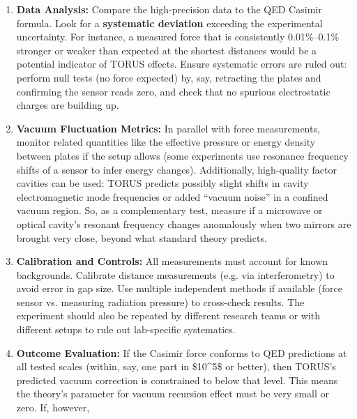 \documentclass[]{article}
\begin{document}
{\begin{itemize}
\begin{enumerate}
    check for any unexpected dependence on material or configuration.
    TORUS's recursion fields might interact differently with different
    boundary conditions​. Standard theory predicts only geometry and
    distance matter (aside from well-understood material corrections);
    any new dependence could be a TORUS signature.
  \item
    \textbf{Data Analysis:} Compare the high-precision data to the QED
    Casimir formula. Look for a \textbf{systematic deviation} exceeding
    the experimental uncertainty. For instance, a measured force that is
    consistently 0.01\%--0.1\% stronger or weaker than expected at the
    shortest distances would be a potential indicator of TORUS effects​.
    Ensure systematic errors are ruled out: perform null tests (no force
    expected) by, say, retracting the plates and confirming the sensor
    reads zero, and check that no spurious electrostatic charges are
    building up.
  \item
    \textbf{Vacuum Fluctuation Metrics:} In parallel with force
    measurements, monitor related quantities like the effective pressure
    or energy density between plates if the setup allows (some
    experiments use resonance frequency shifts of a sensor to infer
    energy changes). Additionally, high-quality factor cavities can be
    used: TORUS predicts possibly slight shifts in cavity
    electromagnetic mode frequencies or added ``vacuum noise'' in a
    confined vacuum region​. So, as a complementary test, measure if a
    microwave or optical cavity's resonant frequency changes anomalously
    when two mirrors are brought very close, beyond what standard theory
    predicts.
  \item
    \textbf{Calibration and Controls:} All measurements must account for
    known backgrounds. Calibrate distance measurements (e.g. via
    interferometry) to avoid error in gap size. Use multiple independent
    methods if available (force sensor vs. measuring radiation pressure)
    to cross-check results. The experiment should also be repeated by
    different research teams or with different setups to rule out
    lab-specific systematics.
  \item
    \textbf{Outcome Evaluation:} If the Casimir force conforms to QED
    predictions at all tested scales (within, say, one part in
    \$10\^{}5\$ or better), then TORUS's predicted vacuum correction is
    constrained to below that level​. This means the theory's parameter
    for vacuum recursion effect must be very small or zero. If, however,

\end{enumerate}
\end{itemize}}
\end{document}
